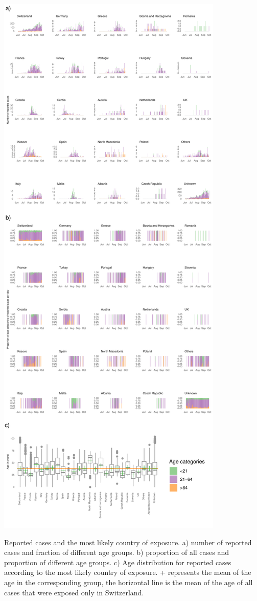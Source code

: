 \documentclass[10pt, a4paper, twoside]{article}
\begin{document}
\clearpage
\begin{suppfigure}[h]
\centering
\includegraphics[scale=0.6]{SF2_2021-04-30.pdf}
\caption{Reported cases and the most likely country of exposure.
a) number of reported cases and fraction of different age groups.
b) proportion of all cases and proportion of different age groups.
c) Age distribution for reported cases according to the most likely country of exposure.
+ represents the mean of the age in the corresponding group, the horizontal line is the mean of the age of all cases that were exposed only in Switzerland.}
\label{sf2}
\end{suppfigure}
\end{document}
